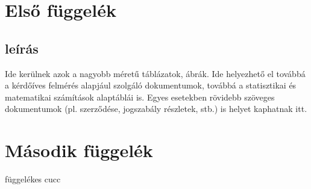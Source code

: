 \documentclass[hidelinks, 12pt, a4paper]{report}
\begin{document}
\appendix
\chapter{Első függelék}

\section{leírás}

Ide kerülnek azok a nagyobb méretű táblázatok, ábrák.
Ide helyezhető el továbbá a kérdőíves felmérés alapjául szolgáló dokumentumok, továbbá a statisztikai és matematikai számítások alaptáblái is.
Egyes esetekben rövidebb szöveges dokumentumok (pl. szerződése, jogszabály részletek, stb.) is helyet kaphatnak itt.

\chapter{Második függelék}

függelékes cucc
\end{document}
